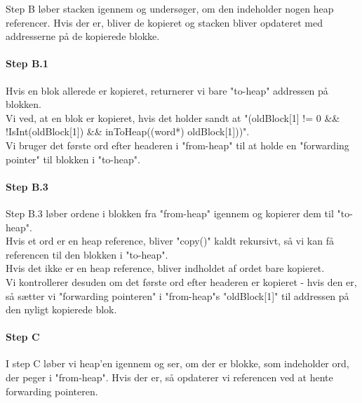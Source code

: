 Step B løber stacken igennem og undersøger, om den indeholder nogen heap referencer. Hvis der er, bliver de kopieret og stacken bliver opdateret med addresserne på de kopierede blokke.
\paragraph{Step B.1}
Hvis en blok allerede er kopieret, returnerer vi bare "to-heap" addressen på blokken. 
\\Vi ved, at en blok er kopieret, hvis det holder sandt at "(oldBlock[1] != 0 \&\& !IsInt(oldBlock[1]) \&\& inToHeap((word*) oldBlock[1]))". 
\\Vi bruger det første ord efter headeren i "from-heap" til at holde en "forwarding pointer" til blokken i "to-heap".
\paragraph{Step B.3}
Step B.3 løber ordene i blokken fra "from-heap" igennem og kopierer dem til "to-heap". 
\\Hvis et ord er en heap reference, bliver "copy()" kaldt rekursivt, så vi kan få referencen til den blokken i "to-heap".
\\Hvis det ikke er en heap reference, bliver indholdet af ordet bare kopieret.
\\ Vi kontrollerer desuden om det første ord efter headeren er kopieret - hvis den er, så sætter vi "forwarding pointeren" i "from-heap"s "oldBlock[1]" til addressen på den nyligt kopierede blok.
\paragraph{Step C}
I step C løber vi heap'en igennem og ser, om der er blokke, som indeholder ord, der peger i "from-heap". Hvis der er, så opdaterer vi referencen ved at hente forwarding pointeren.